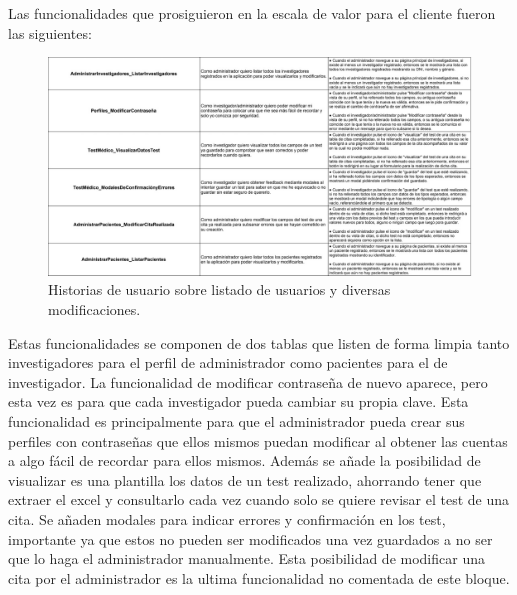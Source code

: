 Las funcionalidades que prosiguieron en la escala de valor para el cliente fueron las siguientes:
\newline

 \begin{figure}[h]
    \centering
     \includegraphics[width=1\textwidth]{images/historiasUsuario-3.jpg}
    \caption{Historias de usuario sobre listado de usuarios y diversas modificaciones.}
\end{figure}
\newline

Estas funcionalidades se componen de dos tablas que listen de forma limpia tanto investigadores para el perfil de administrador como pacientes para el de investigador. La funcionalidad de modificar contraseña de nuevo aparece, pero esta vez es para que cada investigador pueda cambiar su propia clave. Esta funcionalidad es principalmente para que el administrador pueda crear sus perfiles con contraseñas que ellos mismos puedan modificar al obtener las cuentas a algo fácil de recordar para ellos mismos. Además se añade la posibilidad de visualizar es una plantilla los datos de un test realizado, ahorrando tener que extraer el excel y consultarlo cada vez cuando solo se quiere revisar el test de una cita. Se añaden modales para indicar errores y confirmación en los test, importante ya que estos no pueden ser modificados una vez guardados a no ser que lo haga el administrador manualmente. Esta posibilidad de modificar una cita por el administrador es la ultima funcionalidad no comentada de este bloque.

